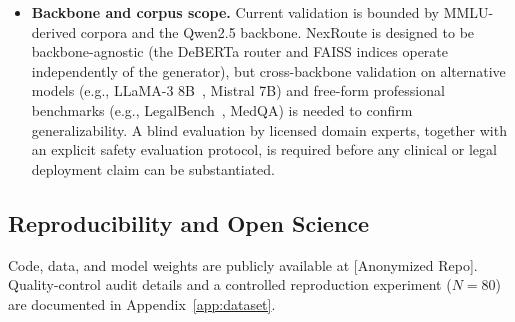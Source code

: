 \documentclass[a4paper,fleql]{cas-sc}
\begin{document}
\begin{itemize}
were validated against human judgement rather than model-generated preferences
alone, further insulating relative model rankings from same-family stylistic
influence. Together, FActScore and the human audit explicitly control for the
circularity risk that lexical metrics such as ROUGE-L and BERTScore cannot
rule out on their own.
BERTScore was additionally computed through an independently pre-trained
RoBERTa-large encoder to reduce embedding-space alignment with the Qwen family.
A rank correlation analysis between ROUGE-L and BERTScore across the five 7B
models yields identical rankings (Spearman's $\rho = 1.000$, $p < 0.001$,
$n = 5$), suggesting that the relative ordering of models is structurally
valid even if absolute scores carry shared-lineage bias.
We note that rank-correlation analysis validates relative model ordering
but does not rule out shared-lineage inflation of absolute BERTScore/ROUGE-L
values, particularly for comparisons against Qwen-family 72B baselines
sharing the same model lineage as the gold-answer generator. Independent
verification using a non-Qwen judge or human-authored gold references
remains an important direction for future work.
We note that an earlier attempt to use Llama-3.1-70B-Instruct as an
independent judge ($n{=}200$) revealed a ceiling effect (92.5\% of scores at 9/10,
inter-model range ${<}0.3$ points; see Section~\ref{sec:factuality}),
motivating our adoption of FActScore as the primary factuality metric.
\item \textbf{Backbone and corpus scope.} Current validation is bounded by MMLU-derived corpora and the Qwen2.5
backbone. NexRoute is designed to be backbone-agnostic (the DeBERTa router
and FAISS indices operate independently of the generator), but cross-backbone
validation on alternative models (e.g., LLaMA-3 8B~\citep{grattafiori2024llama3},
Mistral 7B) and free-form professional benchmarks (e.g.,
LegalBench~\citep{guha2023legalbench}, MedQA) is needed to confirm
generalizability. A blind evaluation by licensed domain experts, together
with an explicit safety evaluation protocol, is required before any clinical
or legal deployment claim can be substantiated.
\end{itemize}
\subsection{Reproducibility and Open Science}
\label{sec:reproducibility}
Code, data, and model weights are publicly available at [Anonymized Repo]. Quality-control audit details and a controlled reproduction experiment ($N{=}80$) are documented in Appendix~\ref{app:dataset}.
\end{document}
